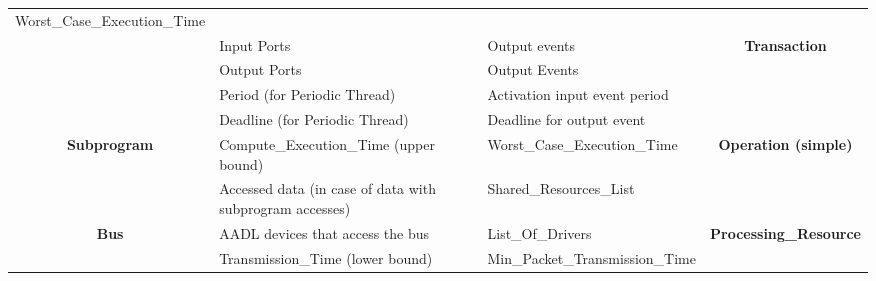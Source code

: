 \documentclass[11pt]{book}
\newcommand{\tbf}[1]{\textbf{#1}}
\begin{document}
{\begin{tabular}{|c|p{5cm}|p{5cm}|c|}
\multicolumn{1}{|p{4cm}|}{Worst\_Case\_Execution\_Time}                                         &   
\multicolumn{1}{|c|}{} \\   \cline {2-4}
\multicolumn{1}{|c|}{} &
\multicolumn{1}{|p{4cm}|}{Input Ports}                             &   
\multicolumn{1}{|p{4cm}|}{Output events}                                         &   
\multicolumn{1}{|c|}{\multirow{3}{*}{\tbf{Transaction}}} \\  \cline {2-3}
\multicolumn{1}{|c|}{} &
\multicolumn{1}{|p{4cm}|}{Output Ports}                             &   
\multicolumn{1}{|p{4cm}|}{Output Events}                                         &   
\multicolumn{1}{|c|}{} \\   \cline {2-3}
\multicolumn{1}{|c|}{} &
\multicolumn{1}{|p{4cm}|}{Period (for Periodic Thread)}                             &   
\multicolumn{1}{|p{4cm}|}{Activation input event period}                                         &   
\multicolumn{1}{|c|}{} \\   \cline {2-3}
\multicolumn{1}{|c|}{} &
\multicolumn{1}{|p{4cm}|}{Deadline (for Periodic Thread)}                             &   
\multicolumn{1}{|p{4cm}|}{Deadline for output event}                                         &   
\multicolumn{1}{|c|}{} \\   \cline {2-4}
\hline \hline
\multicolumn{1}{|c|}{\multirow{2}{*}{\tbf{Subprogram}}} &
\multicolumn{1}{|p{4cm}|}{Compute\_Execution\_Time (upper bound)}                             &   
\multicolumn{1}{|p{4cm}|}{Worst\_Case\_Execution\_Time}                                         &   
\multicolumn{1}{|c|}{\multirow{2}{*}{\tbf{Operation (simple)}}} \\  \cline {2-3}
\multicolumn{1}{|c|}{} &
\multicolumn{1}{|p{4cm}|}{Accessed data (in case of data with subprogram accesses)}                             &   
\multicolumn{1}{|p{4cm}|}{Shared\_Resources\_List}                                         &   
\multicolumn{1}{|c|}{} \\   \cline {2-4}
\hline \hline
\multicolumn{1}{|c|}{\multirow{2}{*}{\tbf{Bus}}} &
\multicolumn{1}{|p{4cm}|}{AADL devices that access the bus}                             &   
\multicolumn{1}{|p{4cm}|}{List\_Of\_Drivers}                                         &   
\multicolumn{1}{|c|}{\multirow{4}{*}{\tbf{Processing\_Resource}}} \\  \cline {2-3}
\multicolumn{1}{|c|}{} &
\multicolumn{1}{|p{4cm}|}{Transmission\_Time (lower bound)}                             &   
\multicolumn{1}{|p{4cm}|}{Min\_Packet\_Transmission\_Time}                                         &   

\end{tabular}}
\end{document}
